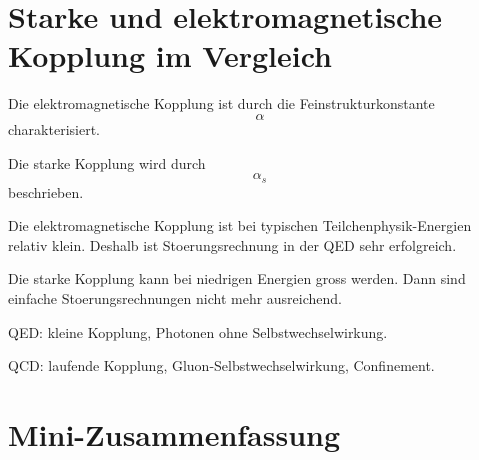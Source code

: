 \section{Starke und elektromagnetische Kopplung im Vergleich}

\begin{conceptbox}
Die elektromagnetische Kopplung ist durch die Feinstrukturkonstante
\[
    \alpha
\]
charakterisiert.

Die starke Kopplung wird durch
\[
    \alpha_s
\]
beschrieben.
\end{conceptbox}

\begin{notebox}
Die elektromagnetische Kopplung ist bei typischen Teilchenphysik-Energien relativ
klein.
Deshalb ist Stoerungsrechnung in der QED sehr erfolgreich.

Die starke Kopplung kann bei niedrigen Energien gross werden.
Dann sind einfache Stoerungsrechnungen nicht mehr ausreichend.
\end{notebox}

\begin{examtipbox}
QED:
kleine Kopplung, Photonen ohne Selbstwechselwirkung.

QCD:
laufende Kopplung, Gluon-Selbstwechselwirkung, Confinement.
\end{examtipbox}

\section{Mini-Zusammenfassung}

